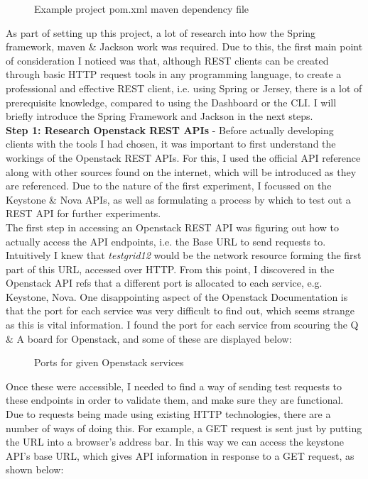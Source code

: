\begin{figure}[H]
\centering
{}
\caption{Example project pom.xml maven dependency file}
\end{figure}

As part of setting up this project, a lot of research into how the Spring framework, maven \& Jackson work was required. Due to this, the first main point of consideration I noticed was that, although REST clients can be created through basic HTTP request tools in any programming language, to create a professional and effective REST client, i.e. using Spring or Jersey, there is a lot of prerequisite knowledge, compared to using the Dashboard or the CLI. I will briefly introduce the Spring Framework and Jackson in the next steps. \\

\textbf{Step 1: Research Openstack REST APIs} - Before actually developing clients with the tools I had chosen, it was important to first understand the workings of the Openstack REST APIs. For this, I used the official API reference\cite{openstackdocs} along with other sources found on the internet, which will be introduced as they are referenced.  Due to the nature of the first experiment, I focussed on the Keystone \& Nova APIs, as well as formulating a process by which to test out a REST API for further experiments. \\

The first step in accessing an Openstack REST API was figuring out how to actually access the API endpoints, i.e. the Base URL to send requests to. Intuitively I knew that \textit{testgrid12} would be the network resource forming the first part of this URL, accessed over HTTP. From this point, I discovered in the Openstack API refs that a different port is allocated to each service, e.g. Keystone, Nova. One disappointing aspect of the Openstack Documentation is that the port for each service was very difficult to find out, which seems strange as this is vital information. I found the port for each service from scouring the Q \& A board for Openstack\cite{openstackports}, and some of these are displayed below:

\begin{figure}[H]
\centering
{}
\caption{Ports for given Openstack services\cite{openstackports}} 
\end{figure}

Once these were accessible, I needed to find a way of sending test requests to these endpoints in order to validate them, and make sure they are functional. Due to requests being made using existing HTTP technologies, there are a number of ways of doing this. For example, a GET request is sent just by putting the URL into a browser's address bar. In this way we can access the keystone API's base URL, which gives API information in response to a GET request, as shown below:

